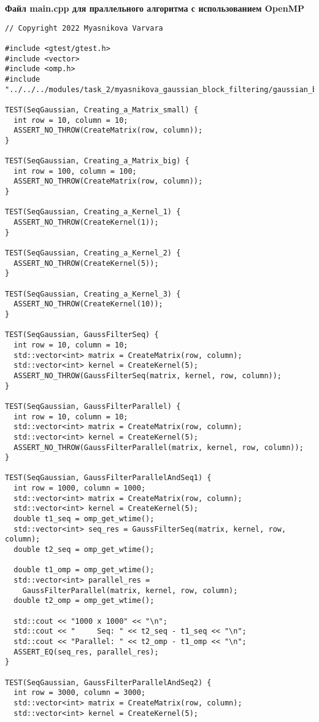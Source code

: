 \documentclass{report}
\begin{document}
\newpage
\textbf{ Файл main.cpp для праллельного алгоритма с использованием OpenMP }
\begin{lstlisting}
// Copyright 2022 Myasnikova Varvara

#include <gtest/gtest.h>
#include <vector>
#include <omp.h>
#include "../../../modules/task_2/myasnikova_gaussian_block_filtering/gaussian_block_filtering.h"

TEST(SeqGaussian, Creating_a_Matrix_small) {
  int row = 10, column = 10;
  ASSERT_NO_THROW(CreateMatrix(row, column));
}

TEST(SeqGaussian, Creating_a_Matrix_big) {
  int row = 100, column = 100;
  ASSERT_NO_THROW(CreateMatrix(row, column));
}

TEST(SeqGaussian, Creating_a_Kernel_1) {
  ASSERT_NO_THROW(CreateKernel(1));
}

TEST(SeqGaussian, Creating_a_Kernel_2) {
  ASSERT_NO_THROW(CreateKernel(5));
}

TEST(SeqGaussian, Creating_a_Kernel_3) {
  ASSERT_NO_THROW(CreateKernel(10));
}

TEST(SeqGaussian, GaussFilterSeq) {
  int row = 10, column = 10;
  std::vector<int> matrix = CreateMatrix(row, column);
  std::vector<int> kernel = CreateKernel(5);
  ASSERT_NO_THROW(GaussFilterSeq(matrix, kernel, row, column));
}

TEST(SeqGaussian, GaussFilterParallel) {
  int row = 10, column = 10;
  std::vector<int> matrix = CreateMatrix(row, column);
  std::vector<int> kernel = CreateKernel(5);
  ASSERT_NO_THROW(GaussFilterParallel(matrix, kernel, row, column));
}

TEST(SeqGaussian, GaussFilterParallelAndSeq1) {
  int row = 1000, column = 1000;
  std::vector<int> matrix = CreateMatrix(row, column);
  std::vector<int> kernel = CreateKernel(5);
  double t1_seq = omp_get_wtime();
  std::vector<int> seq_res = GaussFilterSeq(matrix, kernel, row, column);
  double t2_seq = omp_get_wtime();

  double t1_omp = omp_get_wtime();
  std::vector<int> parallel_res =
    GaussFilterParallel(matrix, kernel, row, column);
  double t2_omp = omp_get_wtime();

  std::cout << "1000 x 1000" << "\n";
  std::cout << "     Seq: " << t2_seq - t1_seq << "\n";
  std::cout << "Parallel: " << t2_omp - t1_omp << "\n";
  ASSERT_EQ(seq_res, parallel_res);
}

TEST(SeqGaussian, GaussFilterParallelAndSeq2) {
  int row = 3000, column = 3000;
  std::vector<int> matrix = CreateMatrix(row, column);
  std::vector<int> kernel = CreateKernel(5);


\end{lstlisting}
\end{document}
